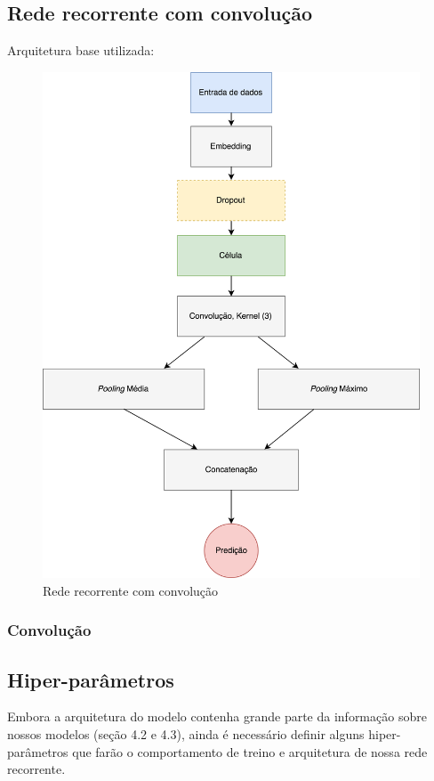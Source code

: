 \documentclass[12pt]{article}
\begin{document}
\subsection{Rede recorrente com convolução}

Arquitetura base utilizada:

\begin{figure}[!htb]
\centering
\includegraphics[width=.5\textwidth]{images/graph.png}
\caption{Rede recorrente com convolução}
\label{fig:graph}
\end{figure}

\subsubsection{Convolução}

\subsection{Hiper-parâmetros}

Embora a arquitetura do modelo contenha grande parte da informação sobre nossos modelos (seção 4.2 e 4.3), ainda é necessário definir alguns hiper-parâmetros que farão o comportamento de treino e arquitetura de nossa rede recorrente.
\end{document}
